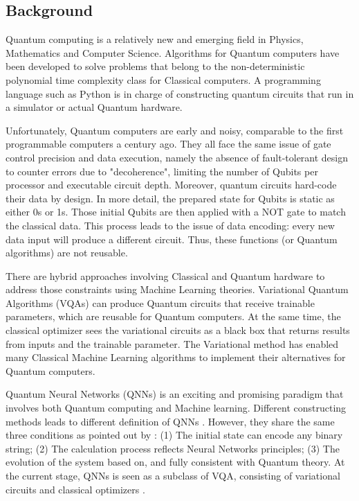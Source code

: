 \subsection{Background}
Quantum computing is a relatively new and emerging field in Physics, Mathematics and Computer Science. 
Algorithms for Quantum computers have been developed to solve problems that belong to the non-deterministic polynomial time complexity class for Classical computers. 
A programming language such as Python is in charge of constructing quantum circuits that run in a simulator or actual Quantum hardware. 

Unfortunately, Quantum computers are early and noisy, comparable to the first programmable computers a century ago. 
They all face the same issue of gate control precision and data execution, namely the absence of fault-tolerant design to counter errors due to "decoherence", limiting the number of Qubits per processor and executable circuit depth. 
Moreover, quantum circuits hard-code their data by design. In more detail, the prepared state for Qubits is static as either 0s or 1s. 
Those initial Qubits are then applied with a NOT gate to match the classical data. This process leads to the issue of data encoding: every new data input will produce a different circuit. 
Thus, these functions (or Quantum algorithms) are not reusable.

There are hybrid approaches involving Classical and Quantum hardware to address those constraints using Machine Learning theories. 
Variational Quantum Algorithms (VQAs) can produce Quantum circuits that receive trainable parameters, which are reusable for Quantum computers. 
At the same time, the classical optimizer sees the variational circuits as a black box that returns results from inputs and the trainable parameter. 
The Variational method has enabled many Classical Machine Learning algorithms to implement their alternatives for Quantum computers.

Quantum Neural Networks (QNNs) \cite{altaisky2001quantum} is an exciting and  promising paradigm that involves both Quantum computing and Machine learning. 
Different constructing methods leads to different definition of QNNs \cite{paetznick2013} \cite{zhaoBuildingQuantumNeural2019} \cite{caoQuantumNeuronElementary2017}. 
However, they share the same three conditions as pointed out by \cite{schuldQuestQuantumNeural2014}: 
(1) The initial state can encode any binary string;
(2) The calculation process reflects Neural Networks principles;
(3) The evolution of the system based on, and fully consistent with Quantum theory.
At the current stage, QNNs is seen as a subclass of VQA, consisting of variational circuits and classical optimizers \cite{abbasPowerQuantumNeural2021}.

